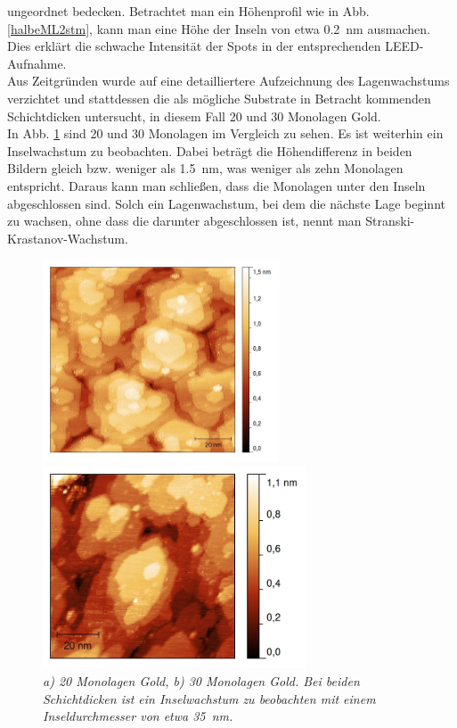 \FloatBarrier

ungeordnet bedecken.
Betrachtet man ein Höhenprofil wie in Abb. \ref{halbeML2stm}, kann man eine Höhe der Inseln von
etwa \SI{0,2}{nm} ausmachen. Dies erklärt die schwache Intensität der Spots in der entsprechenden
LEED-Aufnahme. \\
Aus Zeitgründen wurde auf eine detailliertere Aufzeichnung des Lagenwachstums
verzichtet und stattdessen die als mögliche Substrate in Betracht kommenden Schichtdicken untersucht, in diesem
Fall 20 und 30 Monolagen Gold.\\
In Abb. \ref{MLVergleich} sind 20 und 30 Monolagen im Vergleich zu sehen. Es ist weiterhin ein
Inselwachstum zu beobachten.  Dabei beträgt die Höhendifferenz in beiden Bildern gleich bzw. weniger
als \SI{1,5}{nm}, was weniger als zehn Monolagen entspricht. Daraus kann man schließen, dass die
Monolagen unter den Inseln abgeschlossen sind. Solch ein Lagenwachstum, bei dem die nächste Lage beginnt zu
wachsen, ohne dass die darunter abgeschlossen ist, nennt man Stranski-Krastanov-Wachstum.


\begin{figure}[htbp]
	\begin{minipage}[b]{0.5\textwidth} 
		\includegraphics[height=6cm]{20ML.jpg}
	\end{minipage}
	\hfill
	\begin{minipage}[b]{0.5\textwidth}
		\includegraphics[height=6cm]{30ML.jpg}
	\end{minipage}
	\caption{\textit{a) 20 Monolagen Gold, b) 30 Monolagen Gold. Bei beiden Schichtdicken ist ein
	Inselwachstum zu beobachten mit einem Inseldurchmesser von etwa \SI{35}{nm}.}}
	\label{MLVergleich} 
\end{figure}

